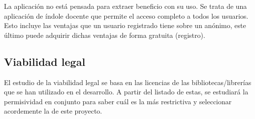 La aplicación no está pensada para extraer beneficio con su uso. Se trata de una
aplicación de índole docente que permite el acceso completo a todos los
usuarios. Esto incluye las ventajas que un usuario registrado tiene sobre un
anónimo, este último puede adquirir dichas ventajas de forma gratuita
(registro).

\clearpage
\subsection{Viabilidad legal}

El estudio de la viabilidad legal se basa en las licencias de las
bibliotecas/librerías que se han utilizado en el desarrollo. A partir del
listado de estas, se estudiará la permisividad en conjunto para saber cuál es la
más restrictiva y seleccionar acordemente la de este proyecto.

